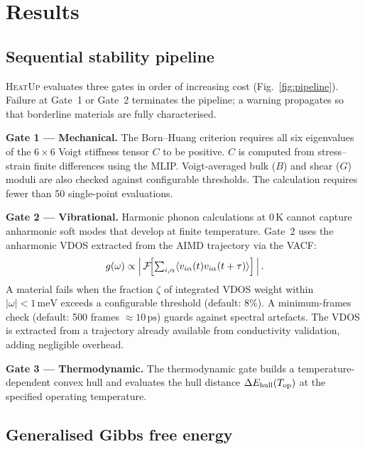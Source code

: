 \documentclass[twocolumn,10pt]{article}
\newcommand{\ehull}{\Delta E_{\mathrm{hull}}}
\newcommand{\vdos}{g(\omega)}
\newcommand{\tp}{\textsc{HeatUp}}
\begin{document}
\section*{Results}

\subsection*{Sequential stability pipeline}

\tp{} evaluates three gates in order of increasing cost (Fig.~\ref{fig:pipeline}).
Failure at Gate~1 or Gate~2 terminates the pipeline; a warning propagates so that
borderline materials are fully characterised.

\textbf{Gate 1 --- Mechanical.}
The Born--Huang criterion\cite{born1954dynamical,mouhat2014necessary} requires all
six eigenvalues of the $6\times6$ Voigt stiffness tensor $C$ to be positive.
$C$ is computed from stress--strain finite differences using the MLIP.
Voigt-averaged bulk ($B$) and shear ($G$) moduli are also checked against configurable
thresholds. The calculation requires fewer than 50 single-point evaluations.

\textbf{Gate 2 --- Vibrational.}
Harmonic phonon calculations at 0\,K cannot capture anharmonic soft modes that develop
at finite temperature\cite{hellman2011lattice,muy2021phonon}.
Gate~2 uses the anharmonic VDOS extracted from the AIMD trajectory via the VACF:
\begin{equation}
  \vdos \propto \left|\,\mathcal{F}\!\Bigl[
    \textstyle\sum_{i,\alpha}\langle v_{i\alpha}(t)v_{i\alpha}(t+\tau)\rangle
  \Bigr]\,\right|. \label{eq:vacf}
\end{equation}
A material fails when the fraction $\zeta$ of integrated VDOS weight within
$|\omega| < 1\,\mathrm{meV}$ exceeds a configurable threshold (default: 8\%).
A minimum-frames check (default: 500 frames $\approx 10\,\mathrm{ps}$) guards
against spectral artefacts.
The VDOS is extracted from a trajectory already available from conductivity validation,
adding negligible overhead.

\textbf{Gate 3 --- Thermodynamic.}
The thermodynamic gate builds a temperature-dependent convex hull and evaluates the
hull distance $\ehull(T_{\rm op})$ at the specified operating temperature.

\subsection*{Generalised Gibbs free energy}
\end{document}
